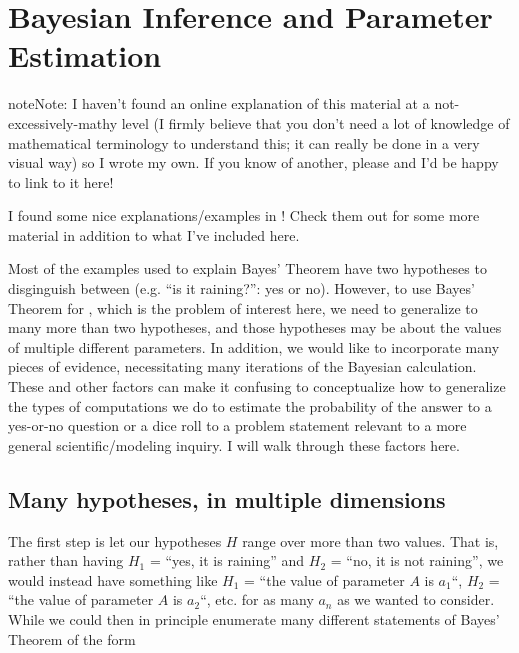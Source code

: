 \documentclass[letterpaper,10pt,english]{sphinxmanual}
\begin{document}
\section{Bayesian Inference and Parameter Estimation}
\label{\detokenize{bayesics:bayesian-inference-and-parameter-estimation}}
\begin{sphinxadmonition}{note}{Note:}
I haven’t found an online explanation of this material at a not-excessively-mathy level (I firmly believe that you don’t need a lot of knowledge of mathematical terminology to understand this; it can really be done in a very visual way) so I wrote my own. If you know of another, please  and I’d be happy to link to it here!

 I found some nice explanations/examples in ! Check them out for some more material in addition to what I’ve included here.
\end{sphinxadmonition}

Most of the examples used to explain Bayes’ Theorem have two hypotheses to disginguish between (e.g. “is it raining?”: yes or no). However, to use Bayes’ Theorem for , which is the problem of interest here, we need to generalize to many more than two hypotheses, and those hypotheses may be about the values of multiple different parameters. In addition, we would like to incorporate many pieces of evidence, necessitating many iterations of the Bayesian calculation. These and other factors can make it confusing to conceptualize how to generalize the types of computations we do to estimate the probability of the answer to a yes-or-no question or a dice roll to a problem statement relevant to a more general scientific/modeling inquiry. I will walk through these factors here.


\subsection{Many hypotheses, in multiple dimensions}
\label{\detokenize{bayesics:many-hypotheses-in-multiple-dimensions}}
The first step is let our hypotheses \(H\) range over more than two values. That is, rather than having \(H_1\) = “yes, it is raining” and \(H_2\) = “no, it is not raining”, we would instead have something like \(H_1\) = “the value of parameter \(A\) is \(a_1\)“, \(H_2\) = “the value of parameter \(A\) is \(a_2\)“, etc. for as many \(a_n\) as we wanted to consider. While we could then in principle enumerate many different statements of Bayes’ Theorem of the form
\end{document}
